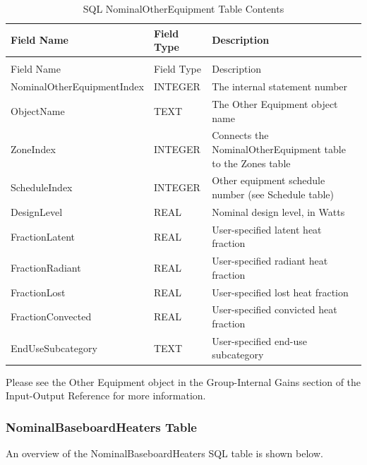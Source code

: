 {\scriptsize
\begin{longtable}[c]{>{\raggedright}p{1.5in}>{\raggedright}p{1.5in}>{\raggedright}p{2.99in}}
\caption{SQL NominalOtherEquipment Table Contents \label{table:table-21.-sql-nominalotherequipment-table}} \tabularnewline
\toprule
Field Name & Field Type & Description \tabularnewline
\midrule
\endfirsthead

\caption[]{SQL NominalOtherEquipment Table Contents} \tabularnewline
\toprule
Field Name & Field Type & Description \tabularnewline
\midrule
\endhead

Nominal\-Other\-Equipment\-Index & INTEGER & The internal statement number \tabularnewline
ObjectName & TEXT & The Other Equipment object name \tabularnewline
ZoneIndex & INTEGER & Connects the NominalOtherEquipment table to the Zones table \tabularnewline
ScheduleIndex & INTEGER & Other equipment schedule number (see Schedule table) \tabularnewline
DesignLevel & REAL & Nominal design level, in Watts \tabularnewline
FractionLatent & REAL & User-specified latent heat fraction \tabularnewline
FractionRadiant & REAL & User-specified radiant heat fraction \tabularnewline
FractionLost & REAL & User-specified lost heat fraction \tabularnewline
FractionConvected & REAL & User-specified convicted heat fraction \tabularnewline
EndUseSubcategory & TEXT & User-specified end-use subcategory \tabularnewline
\bottomrule
\end{longtable}}

Please see the Other Equipment object in the Group-Internal Gains section of the Input-Output Reference for more information.

\subsubsection{NominalBaseboardHeaters Table}

An overview of the NominalBaseboardHeaters SQL table is shown below.

